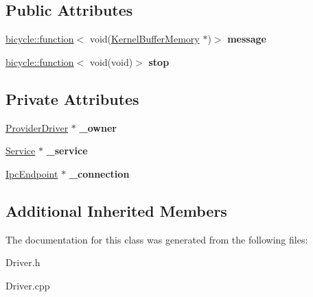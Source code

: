 \subsection*{Public Attributes}
\begin{DoxyCompactItemize}
\item 
\mbox{\label{class_provider_driver_1_1_connection_a99ebed66c13be4560c6eca07108412a4}} 
\hyperlink{classbicycle_1_1function}{bicycle\+::function}$<$ void(\hyperlink{class_kernel_buffer_memory}{Kernel\+Buffer\+Memory} $\ast$)$>$ {\bfseries message}
\item 
\mbox{\label{class_provider_driver_1_1_connection_aecce7d06f85d0060c723197f85d2e180}} 
\hyperlink{classbicycle_1_1function}{bicycle\+::function}$<$ void(void)$>$ {\bfseries stop}
\end{DoxyCompactItemize}
\subsection*{Private Attributes}
\begin{DoxyCompactItemize}
\item 
\mbox{\label{class_provider_driver_1_1_connection_add255e527f1cb37b302423b6e556d705}} 
\hyperlink{class_provider_driver}{Provider\+Driver} $\ast$ {\bfseries \+\_\+owner}
\item 
\mbox{\label{class_provider_driver_1_1_connection_a224a560b89116fbc0cbb2826661cf3ec}} 
\hyperlink{class_provider_driver_1_1_service}{Service} $\ast$ {\bfseries \+\_\+service}
\item 
\mbox{\label{class_provider_driver_1_1_connection_a79a4c9628398e966468908fa6914bd53}} 
\hyperlink{class_ipc_endpoint}{Ipc\+Endpoint} $\ast$ {\bfseries \+\_\+connection}
\end{DoxyCompactItemize}
\subsection*{Additional Inherited Members}


The documentation for this class was generated from the following files\+:\begin{DoxyCompactItemize}
\item 
Driver.\+h\item 
Driver.\+cpp\end{DoxyCompactItemize}

